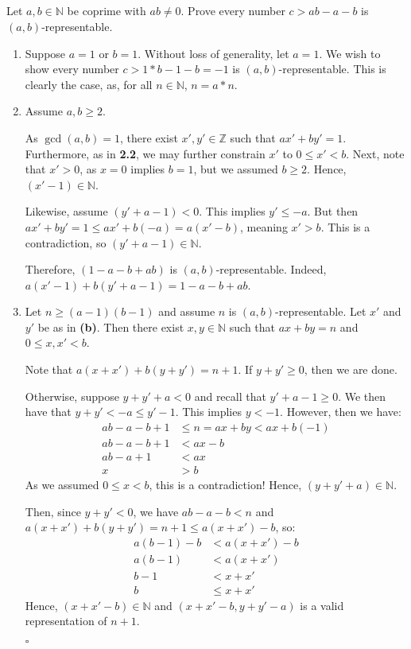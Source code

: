 \documentclass{article}
\newcommand{\N}{\mathbb{N}}
\newcommand{\Z}{\mathbb{Z}}
\begin{document}
\subsection{} %
  Let $a,b\in\N$ be coprime with $ab\ne0$. Prove every number $c>ab-a-b$ is
  $(a,b)$-representable.
  \begin{enumerate}[label=\textbf{(\alph*)}]
    \item{
      Suppose $a=1$ or $b=1$. Without loss of generality, let $a=1$. We wish to
      show every number $c>1*b-1-b=-1$ is $(a,b)$-representable. This is clearly
      the case, as, for all $n\in\N$, $n=a*n$.
    }
    \item{
      Assume $a,b\geq2$.

      As $\gcd(a,b)=1$, there exist $x',y'\in\Z$ such that
      $ax'+by'=1$. Furthermore, as in \textbf{2.2}, we may further constrain
      $x'$ to $0\leq x'<b$. Next, note that $x'>0$, as $x=0$ implies $b=1$, but
      we assumed $b\geq2$. Hence, $(x'-1)\in\N$.

      Likewise, assume $(y'+a-1)<0$. This implies $y'\leq -a$. But then $ax'+by'
      =1\leq ax'+b(-a)=a(x'-b)$, meaning $x'>b$. This is a contradiction, so
      $(y'+a-1)\in\N$.

      Therefore, $(1-a-b+ab)$ is $(a,b)$-representable. Indeed, $a(x'-1)+b(y'+a-
      1)=1-a-b+ab$.
    }
    \item{
      Let $n\geq(a-1)(b-1)$ and assume $n$ is $(a,b)$-representable. Let $x'$
      and $y'$ be as in \textbf{(b)}. Then there exist $x,y\in\N$ such that $ax+
      by=n$ and $0\leq x,x' <b$.

      Note that $a(x+x')+b(y+y')=n+1$. If $y+y'\geq0$, then we are done.

      Otherwise, suppose $y+y'+a<0$ and recall that $y'+a-1\geq0$. We then have
      that $y+y'<-a\leq y'-1$. This implies $y<-1$. However, then we have:
      \begin{align*}
          ab-a-b+1 &\leq n = ax+by < ax+b(-1)\\
          ab-a-b+1 &< ax-b\\
          ab-a+1   &< ax\\
                  x&>b
      \end{align*}
      As we assumed $0\leq x<b$, this is a contradiction! Hence, $(y+y'+a)\in
      \N$.

      Then, since $y+y'<0$, we have $ab-a-b<n$ and $a(x+x')+b(y+y')=
      n+1\leq a(x+x')-b$, so:
      \begin{align*}
        a(b-1)-b &< a(x+x')-b\\
        a(b-1)   &< a(x+x')\\
        b-1      &< x+x'\\
        b        &\leq x+x'
      \end{align*}
      Hence, $(x+x'-b)\in\N$ and $(x+x'-b,y+y'-a)$ is a valid representation of
      $n+1$.
    }
    \hfill $\square$
  \end{enumerate}
\subsection{} %
\subsection{} %
\end{document}
